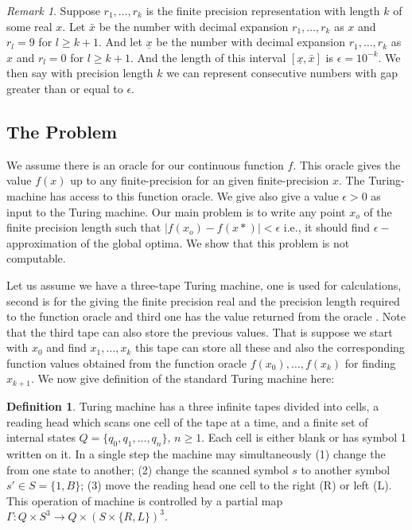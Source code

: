 \documentclass[a4paper,11pt]{article}
\theoremstyle{definition}
\newtheorem{definition}[theorem]{Definition}
\theoremstyle{remark}
\newtheorem{remark}[theorem]{Remark}
\begin{document}
	\begin{remark}\label{gaprem}
		Suppose $r_1,\ldots,r_k$ is the finite precision representation with length $k$ of some real $x$. Let $\bar x$ be the number with decimal expansion $r_1,\ldots,r_k$ as $x$ and $r_{l}=9$ for $l \geq k+1$. And let $\underline x$ be the number with decimal expansion $r_1,\ldots,r_k$ as $x$ and $r_{l}=0$ for $l \geq k+1$. %
		And the length of this interval $[\underline x,\bar x]$ is $\epsilon = 10^{-k}$. We then say with precision length $k$ we can represent consecutive numbers with gap greater than or equal to $\epsilon$.
	\end{remark}
	
	\subsection{The Problem}
	We assume there is an oracle for our continuous function $f$. This oracle gives the value $f(x)$ up to any finite-precision for an given finite-precision $x$. The Turing-machine has access to this function oracle. We give also give a value $\epsilon > 0$ as input to the Turing machine. Our main problem is to write any point $x_{o}$ of the finite precision length such that $|f(x_{o})-f(x*)| < \epsilon$ i.e., it should find $\epsilon-$ approximation of the global optima. We show that this problem is not computable.
	
	Let us assume we have a three-tape Turing machine, one is used for calculations, second is for the giving the finite precision real and the precision length required to the function oracle and third one has the value returned from the oracle \cite{sorbook}. Note that the third tape can also store the previous values. That is suppose we start with $x_0$ and find $x_1,\ldots,x_{k}$ this tape can store all these and also the corresponding function values obtained from the function oracle $f(x_0),\ldots,f(x_k)$ for finding $x_{k+1}$. We now give definition of the standard Turing machine here:
	
	\begin{definition}
		Turing machine has a three infinite tapes divided into cells, a reading head which scans one cell of the tape at a time, and a finite set of internal states $Q=\{q_0,q_1,\ldots,q_n\}, \, n \geq 1$. Each cell is either blank or has symbol 1 written on it. In a single step the machine may simultaneously (1) change the from one state to another; (2) change the scanned symbol $s$ to another symbol $s'\in S = \{1,B\}$; (3) move the reading head one cell to the right (R) or left (L). This operation of machine is controlled by a partial map $\Gamma : Q \times S^3 \rightarrow Q \times (S \times \{R,L\})^3$.
	\end{definition}
	
\end{document}
